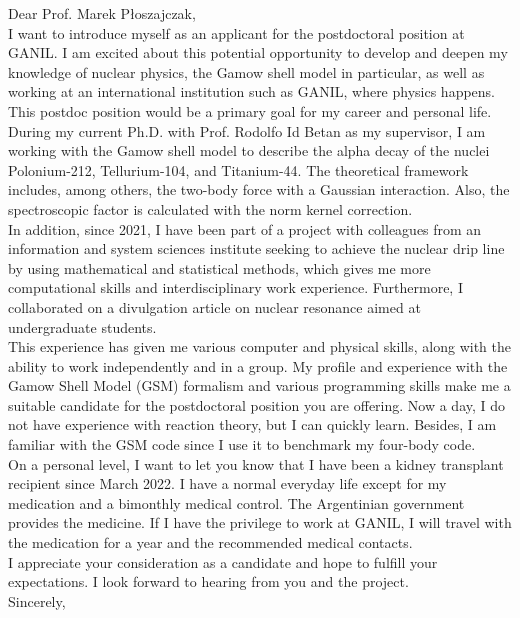 \subject{Application as postdoctoral fellowship in theoretical nuclear physics at GANIL}
\coverletter[sender=false, vspace=4mm]

Dear Prof. Marek Płoszajczak,\\

I want to introduce myself as an applicant for the postdoctoral position at GANIL. I am excited about this potential opportunity to develop and deepen my knowledge of nuclear physics, the Gamow shell model in particular, as well
as working at an international institution such as GANIL, where physics happens. This postdoc position would be a primary goal for my career and personal life. \\

During my current Ph.D. with Prof. Rodolfo Id Betan as my supervisor, I am working with the Gamow shell model to describe the alpha decay of the nuclei Polonium-212, Tellurium-104, and Titanium-44. The theoretical framework includes, among others, the two-body force with a Gaussian interaction. Also, the spectroscopic factor is calculated with the norm kernel correction. \\

In addition, since 2021, I have been part of a project with colleagues from an information and system sciences institute seeking to achieve the nuclear drip line by using mathematical and statistical methods, which gives me more computational skills and interdisciplinary work experience. Furthermore, I collaborated on a divulgation article on nuclear resonance aimed at undergraduate students. \\

This experience has given me various computer and physical skills, along with the ability to work independently and in a group. My profile and experience with the Gamow Shell Model (GSM) formalism and various programming skills make me a suitable candidate for the postdoctoral position you are offering.
Now a day, I do not have experience with reaction theory, but I can quickly learn. Besides, I am familiar with the GSM code since I use it to benchmark my four-body code. \\

On a personal level, I want to let you know that I have been a kidney transplant recipient since March 2022. I have a normal everyday life except for my medication and a bimonthly medical control. The Argentinian government provides the medicine. If I have the privilege to work at GANIL, I will travel with the medication for a year and the recommended medical contacts. \\

I appreciate your consideration as a candidate and hope to fulfill your expectations. I look forward to hearing from you and the project. \\

Sincerely, 
